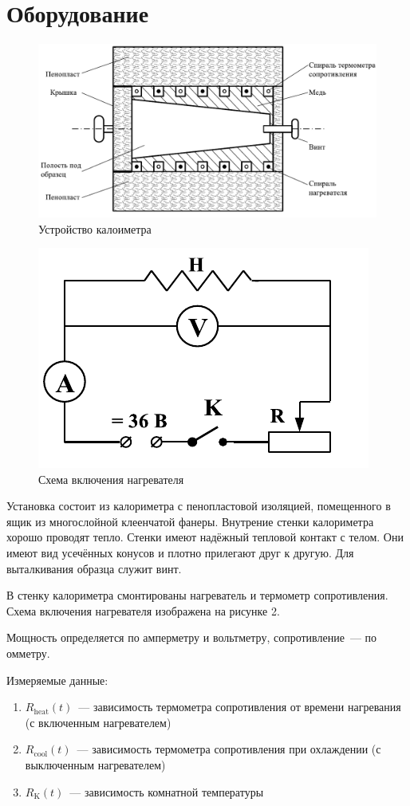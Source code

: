 \section{Оборудование}

\begin{figure}[ht!]
    \centering\includegraphics[width=0.8\linewidth]{img/kal.png}
    \caption{Устройство калоиметра}
\end{figure}
\begin{figure}[ht!]
    \centering\includegraphics[width=0.8\linewidth]{img/el.png}
    \caption{Схема включения нагревателя}
\end{figure}

Установка состоит из калориметра с пенопластовой изоляцией, помещенного в ящик из
многослойной клеенчатой фанеры. Внутрение стенки калориметра хорошо проводят тепло.
Стенки имеют надёжный тепловой контакт с телом. Они имеют вид усечённых конусов и
плотно прилегают друг к другую. Для выталкивания образца служит винт.

В стенку калориметра смонтированы нагреватель и термометр сопротивления. Схема
включения нагревателя изображена на рисунке 2.

Мощность определяется по амперметру и вольтметру, сопротивление~--- по омметру.

Измеряемые данные:
\begin{enumerate}
    \item $R_\text{heat}(t)$~--- зависимость термометра сопротивления от времени нагревания (с включенным нагревателем)
    \item $R_\text{cool}(t)$~--- зависимость термометра сопротивления при охлаждении (с выключенным нагревателем)
    \item $R_\text{K}(t)$~--- зависимость комнатной температуры
\end{enumerate}

